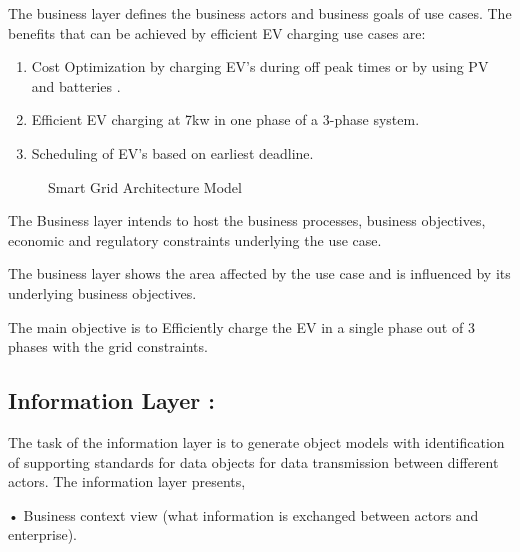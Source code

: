 \documentclass{article}
\begin{document}
The business layer defines the business actors and business goals of use cases. The benefits that can be achieved by efficient EV charging use cases are: 
\begin{enumerate} 
	\item Cost Optimization by charging EV's during off peak times or by using PV and batteries .  
	\item Efficient EV charging at 7kw in one phase of a 3-phase system. 
	\item Scheduling of EV’s based on earliest deadline.
\end{enumerate}
\clearpage
\begin{figure}[h]
	\centering
	\caption{Smart Grid Architecture Model }
	\label{fig:Smart Grid Architecture Model }
\end{figure}
The Business layer intends to host the business processes, business objectives, economic and regulatory constraints underlying the use case. 

The business layer shows the area affected by the use case and is influenced by its underlying business objectives. 

The main objective is to Efficiently charge the EV in a single phase out of 3 phases with the grid constraints.

\subsection{Information Layer :}

The task of the information layer is to generate object models with identification of supporting standards for data objects for data transmission between different actors. The information layer presents, 

• Business context view (what information is exchanged between actors and enterprise).  
\end{document}
